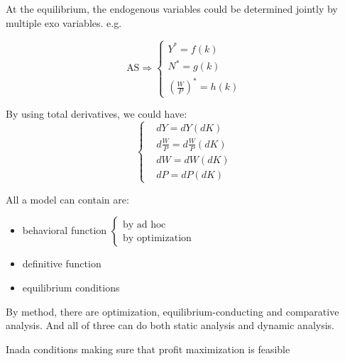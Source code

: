 At the equilibrium, the endogenous variables could be determined jointly by multiple exo variables. e.g.

$$
\text{AS}
 \Rightarrow
\begin{cases}
Y^{*}=f(k) \\
N^{*}=g(k) \\
(\frac{W}{P})^{*}=h(k)
\end{cases}
$$


\begin{redblock}
\begin{question}
\end{question}
By using total derivatives, we could have:
$$\begin{cases}
&dY=dY(dK)
\\&d \frac{W}{P}=d \frac{W}{P}(dK)
\\&dW=dW(dK)
\\&dP=dP(dK)
\end{cases}$$
\end{redblock}

\begin{blueblock}
\begin{note}
All a model can contain are:
\begin{itemize}
\tightlist
  \item behavioral function
    $\begin{cases}
      \text{by ad hoc} \\
      \text{by optimization}
    \end{cases}$
  \item definitive function
  \item equilibrium conditions
\end{itemize}
\end{note}
\end{blueblock}

\begin{blueblock}
\begin{note}
By method, there are optimization, equilibrium-conducting and comparative analysis. And all of three can do both static analysis and dynamic analysis.
\end{note}
\end{blueblock}


\begin{blueblock}
\begin{note}
Inada conditions making sure that profit maximization is feasible
\end{note}
\end{blueblock}




